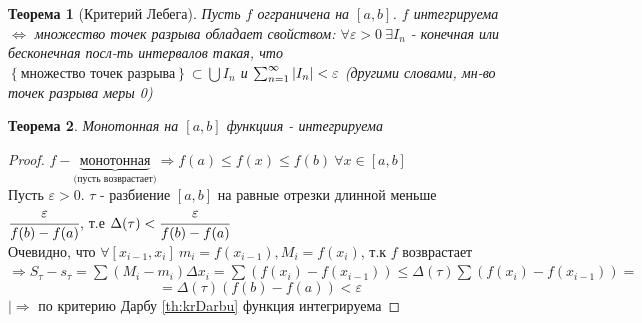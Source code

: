 \documentclass[a4paper]{article}
\newtheorem{theorem}{Теорема}
\theoremstyle{definition}
\newtheorem*{comment}{Замечание}
\newcommand\Set[1]{%
\left\{ #1 \right\}}
\newcommand\abs[1]{%
\mbox{$| #1 |$}}
\newcommand\InAll[0]{%
|\Rightarrow}
\numberwithin{theorem}{subsection}
\numberwithin{lemma}{subsection}
\numberwithin{definition}{subsection}
\numberwithin{comment*}{subsection}
\numberwithin{consequence}{subsection}
\numberwithin{property}{subsection}
\begin{document}

\begin{theorem}[Критерий Лебега]
 Пусть $f$ огграничена на $[a,b]$. $f$ интегрируема $\Leftrightarrow$ множество точек разрыва обладает свойством: $\forall{\varepsilon}>0\ \exists{I_n}$ - конечная или бесконечная посл-ть интервалов такая, что \\
 $\Set{\text{множество точек разрыва}} \subset \bigcup I_n$ и $\sum_{n=1}^{\infty}{\abs{I_n}<\varepsilon}$ (другими словами, мн-во точек разрыва меры 0\label{def:mera_0})
\end{theorem}
\begin{theorem}
 Монотонная на $[a,b]$ функциия - интегрируема
\end{theorem}
\begin{proof}
 $f - \underbrace{\text{монотонная}}_{\text{(пусть возврастает)}} \Rightarrow f(a) \leq f(x) \leq f(b)\ \forall{x} \in [a,b]$\\
 Пусть $\varepsilon>0$. $\tau$ - разбиение $[a,b]$ на равные отрезки длинной меньше $\cfrac{\varepsilon}{f(b)-f(a)}$, т.е $\Delta(\tau) < \cfrac{\varepsilon}{f(b)-f(a)}$ \\
 Очевидно, что $\forall{[x_{i-1}, x_i]}\ m_i = f(x_{i-1}), M_i = f(x_i)$, т.к $f$ возврастает $\Rightarrow S_\tau - s_\tau = \sum{(M_i-m_i)\Delta x_i}= \sum{(f(x_i)-f(x_{i-1}))} \leq \Delta(\tau) \sum{(f(x_i)-f(x_{i-1}))} = $
 $$ = \Delta(\tau)(f(b)-f(a)) <\varepsilon $$
 $\InAll$ по критерию Дарбу \ref{th:krDarbu} функция интегрируема
\end{proof}
\end{document}
